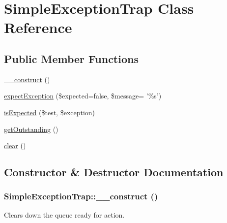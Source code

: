 \hypertarget{class_simple_exception_trap}{
\section{SimpleExceptionTrap Class Reference}
\label{class_simple_exception_trap}
}
\subsection*{Public Member Functions}
\begin{DoxyCompactItemize}
\item 
\hyperlink{class_simple_exception_trap_adc6dee1b5a09070d8058e736046a48bc}{\_\-\_\-construct} ()
\item 
\hyperlink{class_simple_exception_trap_a968818290e76aef73c68bf109f6edaca}{expectException} (\$expected=false, \$message= '\%s')
\item 
\hyperlink{class_simple_exception_trap_a78f097e944e00ef30267744fa28508e4}{isExpected} (\$test, \$exception)
\item 
\hyperlink{class_simple_exception_trap_a2d537afc3ff693620bcacc575e22aea7}{getOutstanding} ()
\item 
\hyperlink{class_simple_exception_trap_a7ac356c223556212bca03226f9d0f815}{clear} ()
\end{DoxyCompactItemize}


\subsection{Constructor \& Destructor Documentation}
\hypertarget{class_simple_exception_trap_adc6dee1b5a09070d8058e736046a48bc}{
\subsubsection[{\_\-\_\-construct}]{\setlength{\rightskip}{0pt plus 5cm}SimpleExceptionTrap::\_\-\_\-construct ()}}
\label{class_simple_exception_trap_adc6dee1b5a09070d8058e736046a48bc}
Clears down the queue ready for action. 

